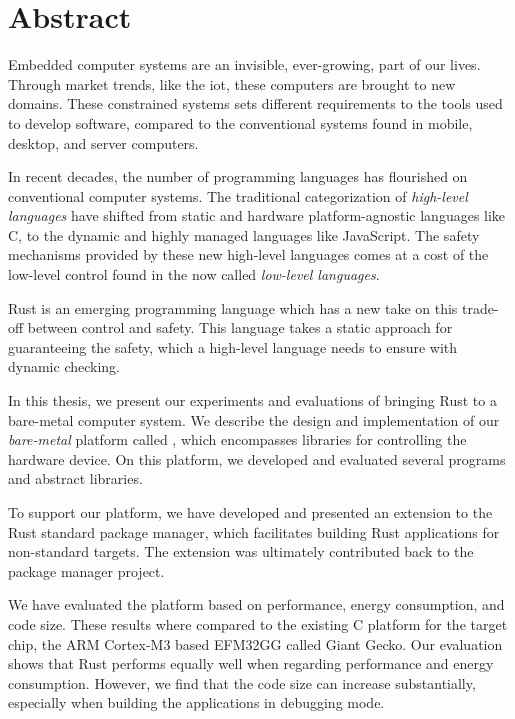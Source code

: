 
\chapter{Abstract}
\label{chap:abstract}

Embedded computer systems are an invisible, ever-growing, part of our lives.
Through market trends, like the \glsdesc{iot}, these computers are brought to new domains.
These constrained systems sets different requirements to the tools used to develop software, compared to the conventional systems found in mobile, desktop, and server computers.

In recent decades, the number of programming languages has flourished on conventional computer systems.
The traditional categorization of \emph{high-level languages} have shifted from static and hardware platform-agnostic languages like C, to the dynamic and highly managed languages like JavaScript.
The safety mechanisms provided by these new high-level languages comes at a cost of the low-level control found in the now called \emph{low-level languages}.

Rust is an emerging programming language which has a new take on this trade-off between control and safety.
This language takes a static approach for guaranteeing the safety, which a high-level language needs to ensure with dynamic checking.

In this thesis, we present our experiments and evaluations of bringing Rust to a bare-metal computer system.
We describe the design and implementation of our \emph{bare-metal} platform called {\rg}, which encompasses libraries for controlling the hardware device.
On this platform, we developed and evaluated several programs and abstract libraries.

To support our platform, we have developed and presented an extension to the Rust standard package manager, which facilitates building Rust applications for non-standard targets.
The extension was ultimately contributed back to the package manager project.

We have evaluated the platform based on performance, energy consumption, and code size.
These results where compared to the existing C platform for the target chip, the ARM Cortex-M3 based EFM32GG called Giant Gecko.
Our evaluation shows that Rust performs equally well when regarding performance and energy consumption.
However, we find that the code size can increase substantially, especially when building the applications in debugging mode.
